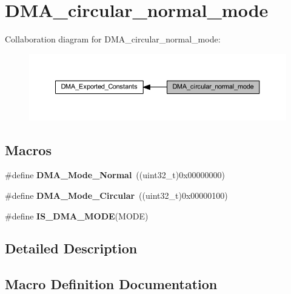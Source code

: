 \hypertarget{group___d_m_a__circular__normal__mode}{}\section{D\+M\+A\+\_\+circular\+\_\+normal\+\_\+mode}
\label{group___d_m_a__circular__normal__mode}
Collaboration diagram for D\+M\+A\+\_\+circular\+\_\+normal\+\_\+mode\+:
\nopagebreak
\begin{figure}[H]
\begin{center}
\leavevmode
\includegraphics[width=350pt]{group___d_m_a__circular__normal__mode}
\end{center}
\end{figure}
\subsection*{Macros}
\begin{DoxyCompactItemize}
\item 
\mbox{\label{group___d_m_a__circular__normal__mode_ga36400f5b5095f1102ede4760d7a5959c}} 
\#define {\bfseries D\+M\+A\+\_\+\+Mode\+\_\+\+Normal}~((uint32\+\_\+t)0x00000000)
\item 
\mbox{\label{group___d_m_a__circular__normal__mode_ga36327b14c302098fbc5823ac3f1ae020}} 
\#define {\bfseries D\+M\+A\+\_\+\+Mode\+\_\+\+Circular}~((uint32\+\_\+t)0x00000100)
\item 
\#define {\bfseries I\+S\+\_\+\+D\+M\+A\+\_\+\+M\+O\+DE}(M\+O\+DE)
\end{DoxyCompactItemize}


\subsection{Detailed Description}


\subsection{Macro Definition Documentation}
\mbox{\label{group___d_m_a__circular__normal__mode_gad88ee5030574d6a573904378fb62c7ac}} 
